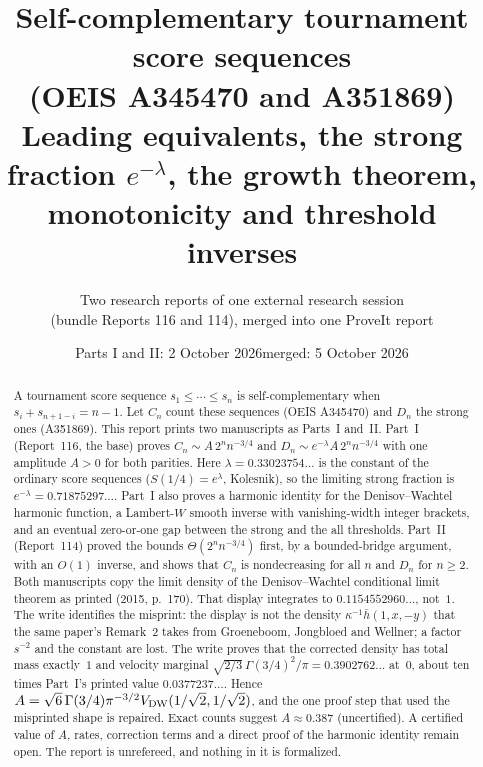 \documentclass[11pt,letterpaper]{article}
\title{\vspace{-1.2em}\textbf{Self-complementary tournament score sequences\\(OEIS A345470 and A351869)}\\[7pt]
\large Leading equivalents, the strong fraction $e^{-\lambda}$, the growth theorem,\\ monotonicity and threshold inverses}
\author{Two research reports of one external research session\\(bundle Reports 116 and 114), merged into one ProveIt report}
\date{Parts I and II: 2 October 2026\quad merged: 5 October 2026}
\theoremstyle{definition}\newtheorem{remark}[theorem]{Remark}
\begin{document}
\hypersetup{pageanchor=false}
\maketitle
\thispagestyle{empty}
\begin{abstract}
A tournament score sequence $s_1\le\cdots\le s_n$ is self-complementary when $s_i+s_{n+1-i}=n-1$. Let $C_n$ count these sequences (OEIS A345470) and $D_n$ the strong ones (A351869). This report prints two manuscripts as Parts~I and~II. Part~I (Report~116, the base) proves $C_n\sim A\,2^nn^{-3/4}$ and $D_n\sim e^{-\lambda}A\,2^nn^{-3/4}$ with one amplitude $A>0$ for both parities. Here $\lambda=0.33023754\ldots$ is the constant of the ordinary score sequences ($S(1/4)=e^\lambda$, Kolesnik), so the limiting strong fraction is $e^{-\lambda}=0.71875297\ldots$. Part~I also proves a harmonic identity for the Denisov--Wachtel harmonic function, a Lambert-$W$ smooth inverse with vanishing-width integer brackets, and an eventual zero-or-one gap between the strong and the all thresholds. Part~II (Report~114) proved the bounds $\Theta(2^nn^{-3/4})$ first, by a bounded-bridge argument, with an $O(1)$ inverse, and shows that $C_n$ is nondecreasing for all $n$ and $D_n$ for $n\ge2$. Both manuscripts copy the limit density of the Denisov--Wachtel conditional limit theorem as printed (2015, p.~170). That display integrates to $0.1154552960\ldots$, not~$1$. The write identifies the misprint: the display is not the density $\kappa^{-1}\bar h(1,x,-y)$ that the same paper's Remark~2 takes from Groeneboom, Jongbloed and Wellner; a factor $s^{-2}$ and the constant are lost. The write proves that the corrected density has total mass exactly~$1$ and velocity marginal $\sqrt{2/3}\,\Gamma(3/4)^2/\pi=0.3902762\ldots$ at~$0$, about ten times Part~I's printed value $0.0377237\ldots$. Hence $A=\sqrt6\,\Gamma(3/4)\pi^{-3/2}V_{\mathrm{DW}}(1/\sqrt2,1/\sqrt2)$, and the one proof step that used the misprinted shape is repaired. Exact counts suggest $A\approx0.387$ (uncertified). A certified value of $A$, rates, correction terms and a direct proof of the harmonic identity remain open. The report is unrefereed, and nothing in it is formalized.
\end{abstract}
\hypersetup{pageanchor=true}
\setcounter{tocdepth}{1}
\tableofcontents
\newpage
\end{document}
